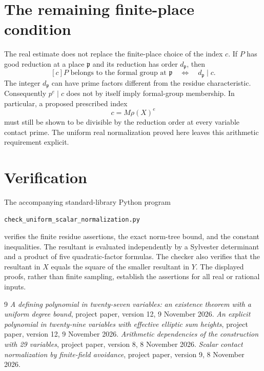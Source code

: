 \documentclass[11pt]{article}
\theoremstyle{remark}\newtheorem{remark}[theorem]{Remark}
\begin{document}
\section{The remaining finite-place condition}

The real estimate does not replace the finite-place choice of the
index $c$.  If $P$ has good reduction at a place $\mathfrak p$ and
its reduction has order $d_{\mathfrak p}$, then
\[
          [c]P\text{ belongs to the formal group at }\mathfrak p
          \quad\Longleftrightarrow\quad d_{\mathfrak p}\mid c.
\]
The integer $d_{\mathfrak p}$ can have prime factors different
from the residue characteristic.  Consequently $p^e\mid c$ does
not by itself imply formal-group membership.  In particular,
a proposed prescribed index
\[
                       c=M\rho(X)^e
\]
must still be shown to be divisible by the reduction order at
every variable contact prime.  The uniform real normalization
proved here leaves this arithmetic requirement explicit.

\section*{Verification}

The accompanying standard-library Python program
\begin{center}\small
\nolinkurl{check_uniform_scalar_normalization.py}
\end{center}
verifies the finite residue assertions, the exact norm-tree bound, and the constant
inequalities.  The resultant is evaluated independently by a Sylvester determinant
and a product of five quadratic-factor formulas.  The checker also
verifies that the resultant in $X$ equals the square of the smaller
resultant in $Y$.  The displayed proofs,
rather than finite sampling,
establish the assertions for all real or rational inputs.

\begin{thebibliography}{9}
\emph{A defining polynomial in twenty-seven variables:}
\emph{an existence theorem with a uniform degree bound},
project paper, version 12, 9 November 2026.
\emph{An explicit polynomial in twenty-nine variables
with effective elliptic sum heights},
project paper, version 12, 9 November 2026.
\emph{Arithmetic dependencies of the construction with 29 variables},
project paper, version 8, 8 November 2026.
\emph{Scalar contact normalization by finite-field avoidance},
project paper, version 9, 8 November 2026.
\end{thebibliography}
\end{document}
